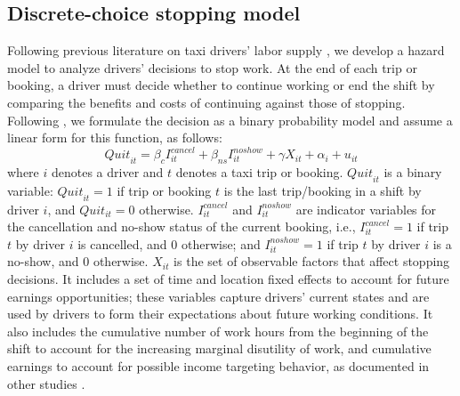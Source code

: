 \documentclass[reviewmode]{AEA}
\begin{document}
\subsection{Discrete-choice stopping model}
Following previous literature on taxi drivers' labor supply \citep{farber2005tomorrow,farber2015you,agarwal2015singaporean,chen2015dynamic}, we develop a hazard model to analyze drivers' decisions to stop work. At the end of each trip or booking, a driver must decide whether to continue working or end the shift by comparing the benefits and costs of continuing against those of stopping. 
Following \citet{farber2005tomorrow,farber2015you}, we  
formulate the decision as a  binary probability model 
and assume a linear form for this function, as follows:
\begin{equation}
\label{eq:quit}
{Quit}_{it} = \beta_{c}I^{cancel}_{it} + \beta_{ns} I^{noshow}_{it} + \gamma X_{it} + \alpha_i  + u_{it}
\end{equation}
where $i$ denotes a driver and $t$ denotes a taxi trip or booking. ${Quit}_{it}$ is a binary variable: ${Quit}_{it} = 1$ if trip or booking $t$ is the last trip/booking in a shift by driver $i$, and $Quit_{it} = 0$ otherwise. $I^{cancel}_{it}$ and $I^{noshow}_{it}$ are indicator variables for the cancellation and no-show status of the current booking, i.e., $I^{cancel}_{it}=1$ if trip $t$ by driver $i$ is cancelled, and $0$ otherwise; and $I^{noshow}_{it}=1$ if trip $t$ by driver $i$ is a no-show, and $0$ otherwise. $X_{it}$ is the set of observable factors that affect stopping decisions.  It includes a set of time and location fixed effects to account for future earnings opportunities; these variables capture drivers' current states and are used by drivers to form their expectations about future working conditions. It also includes the cumulative number of work hours from the beginning of the shift to account for the increasing marginal disutility of work, and cumulative earnings to account for possible income targeting behavior, as documented in other studies \citep{camerer1997labor,crawford2011new}.
\end{document}
